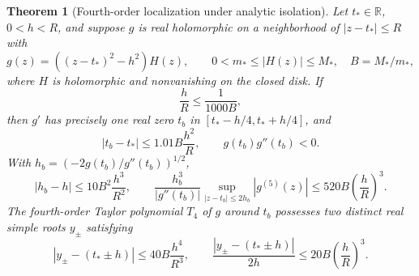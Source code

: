 \documentclass[11pt,reqno]{amsart}
\numberwithin{equation}{section}
\newtheorem{theorem}{Theorem}[section]
\theoremstyle{definition}
\theoremstyle{remark}
\newcommand{\R}{\mathbb R}
\begin{document}
\begin{theorem}[Fourth-order localization under analytic isolation]\label{thm:isolated}
Let $t_*\in\R$, $0<h<R$, and suppose $g$ is real holomorphic on a neighborhood of $|z-t_*|\le R$ with
\begin{equation}\label{eq:factorH}
 g(z)=((z-t_*)^2-h^2)H(z),\qquad
 0<m_*\le|H(z)|\le M_*,\quad B=M_*/m_*,
\end{equation}
where $H$ is holomorphic and nonvanishing on the closed disk. If
\begin{equation}\label{eq:isolcond}
 \frac hR\le\frac1{1000B},
\end{equation}
then $g'$ has precisely one real zero $t_b$ in $[t_*-h/4,t_*+h/4]$, and
\begin{equation}\label{eq:tb}
 |t_b-t_*|\le1.01 B\frac{h^2}R,\qquad g(t_b)g''(t_b)<0.
\end{equation}
With $h_b=(-2g(t_b)/g''(t_b))^{1/2}$,
\begin{equation}\label{eq:hb}
 |h_b-h|\le10B^2\frac{h^3}{R^2},\qquad
 \frac{h_b^3}{|g''(t_b)|}\sup_{|z-t_b|\le2h_b}|g^{(5)}(z)|
 \le520B\left(\frac hR\right)^3.
\end{equation}
The fourth-order Taylor polynomial $T_4$ of $g$ around $t_b$ possesses two distinct real simple roots $y_\pm$ satisfying
\begin{equation}\label{eq:q4}
 |y_\pm-(t_*\pm h)|\le40B\frac{h^4}{R^3},\qquad
 \frac{|y_\pm-(t_*\pm h)|}{2h}\le20B\left(\frac hR\right)^3.
\end{equation}
\end{theorem}
\end{document}
